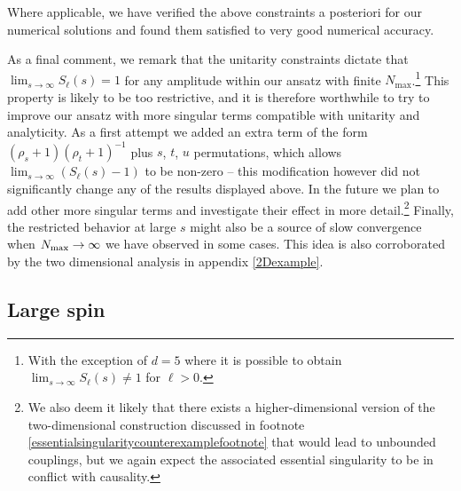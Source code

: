 \documentclass[12pt]{article}
\newcommand{\<}{{\langle}}
\renewcommand{\>}{{\rangle}}
\begin{document}
Where applicable, we have verified the above constraints a posteriori for our numerical solutions and found them satisfied to very good numerical accuracy.

As a final comment, we remark that the unitarity constraints dictate that $\lim_{s\to \infty} S_\ell(s)=1$ for any amplitude within our ansatz with finite $N_{\max}$.\footnote{With the exception of  $d=5$  where it is possible to obtain $\lim_{s\to \infty} S_\ell(s)\neq 1$ for $\ell>0$.}
This property is likely to be too restrictive, and it is therefore worthwhile to try to improve our ansatz with more singular terms compatible with unitarity and analyticity. As a first attempt we added an extra term of the form $(\rho_s + 1)(\rho_t + 1)^{-1}$ plus $s$, $t$, $u$ permutations, which allows $\lim_{s \to \infty} (S_\ell(s) - 1)$ to be non-zero -- this modification however did not significantly change any of the results displayed above. In the future we plan to add other more singular terms and investigate their effect in more detail.\footnote{We also deem it likely that there exists a higher-dimensional version of the two-dimensional construction discussed in footnote \ref{essentialsingularitycounterexamplefootnote} that would lead to unbounded couplings, but we again expect the associated essential singularity to be in conflict with causality.} Finally, the restricted behavior at large $s$ might also be a source of slow convergence when $N_{\rm max} \to \infty$ we have observed in some cases. This idea is also corroborated by the two dimensional analysis in appendix \ref{2Dexample}.

\subsection{Large spin}
\end{document}
